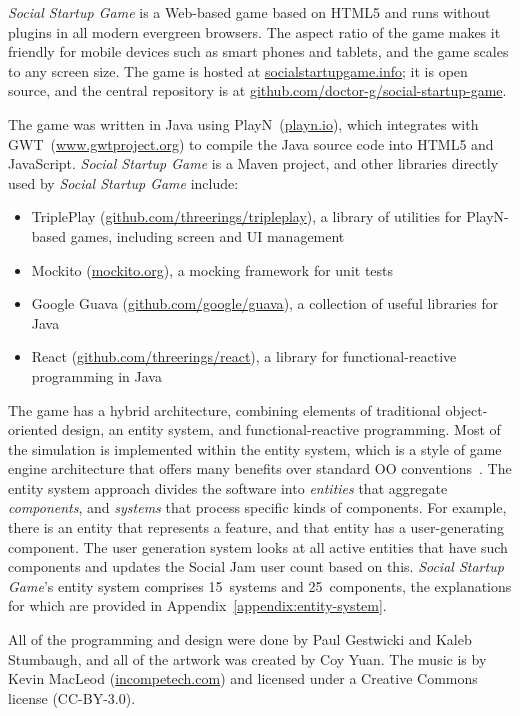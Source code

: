\documentclass[letterpaper]{article}
\begin{document}
\textit{Social Startup Game} is a Web-based game based on HTML5 and
runs without plugins in all modern evergreen browsers. The aspect
ratio of the game makes it friendly for mobile devices such as smart
phones and tablets, and the game scales to any screen size.  The game
is hosted at \url{socialstartupgame.info}; it is open source, and the
central repository is at
\url{github.com/doctor-g/social-startup-game}.

The game was written in Java using PlayN~(\url{playn.io}),
which integrates with GWT~(\url{www.gwtproject.org})
to compile the Java source code into
HTML5 and JavaScript. 
\textit{Social Startup Game} is a Maven project, and other
libraries directly 
used by \textit{Social Startup Game} include: 
\begin{itemize}
\item TriplePlay (\url{github.com/threerings/tripleplay}), 
 a library of utilities for PlayN-based games, including 
 screen and UI management
\item Mockito (\url{mockito.org}), a mocking framework for unit tests
\item Google Guava (\url{github.com/google/guava}), a collection
 of useful libraries for Java
\item React (\url{github.com/threerings/react}), a library for
 functional-reactive programming in Java
\end{itemize}

The game has a hybrid architecture, combining elements of traditional
object-oriented design, an entity system, and functional-reactive
programming.
Most of the simulation is implemented within the entity system,
which is a style of game engine architecture that offers many benefits over
standard OO conventions~\citep{Gestwicki2012}. The entity system
approach divides the software into \textit{entities} that
aggregate \textit{components}, and \textit{systems} that process 
specific kinds of components.
For example, there is an entity that represents a feature, and that
entity has a user-generating component. The user generation system
looks at all active entities that have such components and updates
the Social Jam user count based on this.
\textit{Social Startup Game}'s entity system comprises 15~systems
and 25~components, the explanations for which are provided
in Appendix~\ref{appendix:entity-system}.

All of the programming and design were done by Paul Gestwicki and
Kaleb Stumbaugh, and all of the artwork was created by Coy Yuan.  The
music is by Kevin MacLeod (\url{incompetech.com}) and licensed under a
Creative Commons license (CC-BY-3.0).
\end{document}
